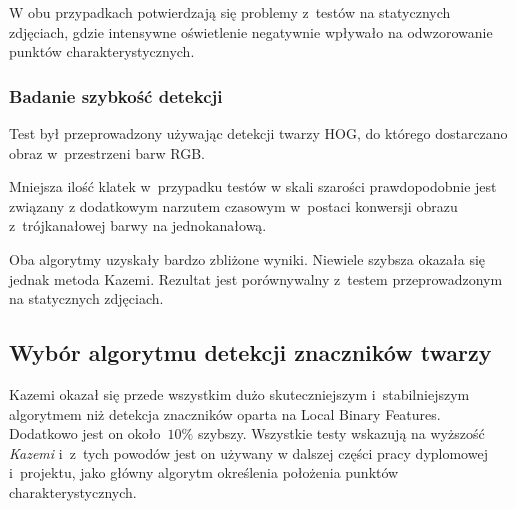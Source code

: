 \par

W obu przypadkach potwierdzają się problemy z~testów na statycznych zdjęciach, gdzie intensywne oświetlenie negatywnie wpływało na odwzorowanie punktów charakterystycznych. 

\subsubsection{Badanie szybkość detekcji} \label{section:facemark_speed_live}

Test był przeprowadzony używając detekcji twarzy HOG, do którego dostarczano obraz w~przestrzeni barw RGB. 



Mniejsza ilość klatek w~przypadku testów w skali szarości prawdopodobnie jest związany z dodatkowym narzutem czasowym w~postaci konwersji obrazu z~trójkanałowej barwy na jednokanałową.

\par

Oba algorytmy uzyskały bardzo zbliżone wyniki. Niewiele szybsza okazała się jednak metoda Kazemi. Rezultat jest porównywalny z~testem przeprowadzonym na statycznych zdjęciach.





\subsection{Wybór algorytmu detekcji znaczników twarzy}

Kazemi okazał się przede wszystkim dużo skuteczniejszym i~stabilniejszym algorytmem niż detekcja znaczników oparta na Local Binary Features. Dodatkowo jest on około~$10\%$ szybszy. Wszystkie testy wskazują na wyższość \textit{Kazemi} i~z~tych powodów jest on używany w dalszej części pracy dyplomowej i~projektu, jako główny algorytm określenia położenia punktów charakterystycznych. 